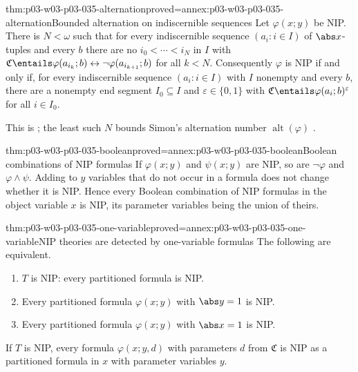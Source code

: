 \begin{hbtheorem}{thm:p03-w03-p03-035-alternation}{proved=annex:p03-w03-p03-035-alternation}{Bounded alternation on indiscernible sequences}
Let \(\varphi(x;y)\) be NIP.  There is \(N<\omega\) such that for every
indiscernible sequence \((a_i:i\in I)\) of \(\abs x\)-tuples and every
\(b\) there are no \(i_0<\cdots<i_N\) in \(I\) with
\(\mathfrak C\entails\varphi(a_{i_k};b)\leftrightarrow\neg\varphi(a_{i_{k+1}};b)\)
for all \(k<N\).  Consequently \(\varphi\) is NIP if and only if, for every
indiscernible sequence \((a_i:i\in I)\) with \(I\) nonempty and every
\(b\), there are a nonempty end segment \(I_0\subseteq I\) and
\(\varepsilon\in\{0,1\}\) with \(\mathfrak C\entails\varphi(a_i;b)^{\varepsilon}\)
for all \(i\in I_0\).
\end{hbtheorem}

This is \cite[Proposition~2.8, p.~16]{Simon2015GuideManuscript}; the least
such \(N\) bounds Simon's alternation number
\(\operatorname{alt}(\varphi)\) \cite[p.~15]{Simon2015GuideManuscript}.

\begin{hblemma}{thm:p03-w03-p03-035-boolean}{proved=annex:p03-w03-p03-035-boolean}{Boolean combinations of NIP formulas}
If \(\varphi(x;y)\) and \(\psi(x;y)\) are NIP, so are \(\neg\varphi\) and
\(\varphi\wedge\psi\).  Adding to \(y\) variables that do not occur in a
formula does not change whether it is NIP.  Hence every Boolean combination
of NIP formulas in the object variable \(x\) is NIP, its parameter variables
being the union of theirs.
\end{hblemma}

\begin{hbtheorem}{thm:p03-w03-p03-035-one-variable}{proved=annex:p03-w03-p03-035-one-variable}{NIP theories are detected by one-variable formulas}
The following are equivalent.
\begin{enumerate}
  \item \(T\) is NIP: every partitioned formula is NIP.
  \item Every partitioned formula \(\varphi(x;y)\) with \(\abs y=1\) is NIP.
  \item Every partitioned formula \(\varphi(x;y)\) with \(\abs x=1\) is NIP.
\end{enumerate}
If \(T\) is NIP, every formula \(\varphi(x;y,d)\) with parameters \(d\) from
\(\mathfrak C\) is NIP as a partitioned formula in \(x\) with parameter
variables \(y\).
\end{hbtheorem}


